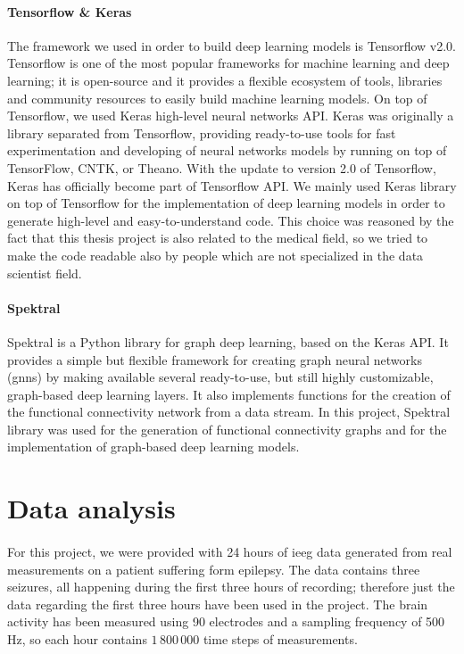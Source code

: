 \paragraph{Tensorflow \& Keras} \cite{tensorflow} \cite{keras} The framework we used in order to build deep learning models is Tensorflow v2.0. Tensorflow is one of the most popular frameworks for machine learning and deep learning; it is open-source and it provides a flexible ecosystem of tools, libraries and community resources to easily build machine learning models. On top of Tensorflow, we used Keras high-level neural networks API. Keras was originally a library separated from Tensorflow, providing ready-to-use tools for fast experimentation and developing of neural networks models by running on top of TensorFlow, CNTK, or Theano. With the update to version 2.0 of Tensorflow, Keras has officially become part of Tensorflow API. We mainly used Keras library on top of Tensorflow for the implementation of deep learning models in order to generate high-level and easy-to-understand code. This choice was reasoned by the fact that this thesis project is also related to the medical field, so we tried to make the code readable also by people which are not specialized in the data scientist field.

\paragraph{Spektral} \cite{Spektral} Spektral is a Python library for graph deep learning, based on the Keras API. It provides a simple but flexible framework for creating graph neural networks (\acsp{gnn}) by making available several ready-to-use, but still highly customizable, graph-based deep learning layers. It also implements functions for the creation of the functional connectivity network from a data stream. In this project, Spektral library was used for the generation of functional connectivity graphs and for the implementation of graph-based deep learning models.



\section{Data analysis} \label{sec: data_analysis}

\paragraph{} For this project, we were provided with 24 hours of \acs{ieeg} data generated from real measurements on a patient suffering form epilepsy. The data contains three seizures, all happening during the first three hours of recording; therefore just the data regarding the first three hours have been used in the project. The brain activity has been measured using 90 electrodes and a sampling frequency of 500 Hz, so each hour contains $1\,800\,000$ time steps of measurements.

